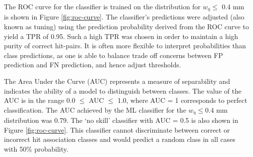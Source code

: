 The ROC curve for the classifier is trained on the distribution for $w_{\eta} \le$ 0.4 mm is shown in Figure \ref{fig:roc-curve}. The classifier’s predictions were adjusted (also known as tuning) using the prediction probability derived from the ROC curve to yield a TPR of 0.95. Such a high TPR was chosen in order to maintain a high purity of correct hit-pairs. It is often more flexible to interpret probabilities than class predictions, as one is able to balance trade off concerns between FP prediction and FN prediction, and hence adjust thresholds.

The Area Under the Curve (AUC) represents a measure of separability and indicates the ability of a model to distinguish between classes. The value of the AUC is in the range 0.0 $\leq$ AUC $\leq$ 1.0, where AUC = 1 corresponds to perfect classification. The AUC achieved by the ML classifier for the $w_{\eta} \leq 0.4$ mm distribution was 0.79. The ‘no skill’ classifier with AUC = 0.5 is also shown in Figure \ref{fig:roc-curve}. This classifier cannot discriminate between correct or incorrect hit association classes and would predict a random class in all cases with 50\% probability.


